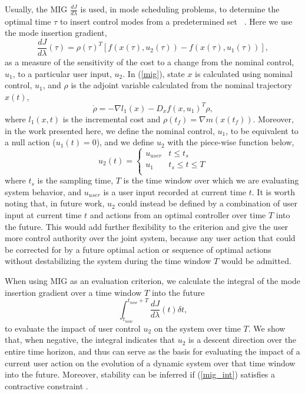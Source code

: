 Usually, the MIG $ \frac{dJ}{d\lambda}$ is used, in mode scheduling problems, to determine the optimal time $\tau$ to insert control modes from a predetermined set ~\cite{egerstedt2006,modesched2012,vaseduvan_switchsys2010, alex_SAC, caldwell2016}. Here we use the mode insertion gradient,
\begin{equation}\label{mig}
    \frac{dJ}{d\lambda}(\tau)=\rho(\tau)^T \left[f(x(\tau),u_2(\tau))-f(x(\tau),u_1(\tau))\right],
\end{equation}
as a measure of the sensitivity of the cost to a change from the nominal control, $u_1$, to a particular user input, $u_2$. In (\ref{mig}), state $x$ is calculated using nominal control, $u_1$, and $\rho$ is the adjoint variable calculated from the nominal trajectory $x(t)$,
\begin{equation*}
    \dot \rho = -\nabla l_1(x)-D_xf(x,u_1)^T\rho,
\end{equation*}
where $l_1(x,t)$ is the incremental cost and $\rho(t_f)=\nabla m(x(t_f))$. Moreover, in the work presented here, we define the nominal control, $u_1$, to be equivalent to a null action ($u_1(t) = 0$), and we define $u_2$ with the piece-wise function below,
\[ u_2(t) =  \left\{
		\begin{array}{ll}
  			u_{user} & t\leq t_s \\
  			u_1 & t_s\leq t\leq T \\
		\end{array} 
\right. \]
where $t_s$ is the sampling time, $T$ is the time window over which we are evaluating system behavior, and $u_{user}$ is a user input recorded at current time $t$. It is worth noting that, in future work, $u_2$ could instead be defined by a combination of user input at current time $t$ and actions from an optimal controller over time $T$ into the future. This would add further flexibility to the criterion and give the user more control authority over the joint system, because any user action that could be corrected for by a future optimal action or sequence of optimal actions without destabilizing the system during the time window $T$ would be admitted.  

When using MIG as an evaluation criterion, we calculate the integral of the mode insertion gradient over a time window $T$ into the future
\begin{equation}\label{mig_int}
    \int_{t_{now}}^{t_{now}+T}\frac{dJ}{d\lambda}(t)\delta t,
\end{equation}
to evaluate the impact of user control $u_2$ on the system over time $T$. We show that, when negative, the integral indicates that $u_2$ is a descent direction over the entire time horizon, and thus can serve as the basis for evaluating the impact of a current user action on the evolution of a dynamic system over that time window into the future. Moreover, stability can be inferred if (\ref{mig_int}) satisfies a contractive constraint \cite{contractive, iSAC}. 

